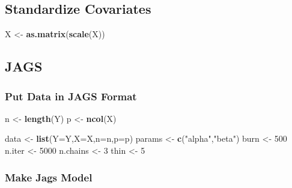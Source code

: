 \documentclass[
]{article}
\newenvironment{Shaded}{\begin{snugshade}}{\end{snugshade}}
\newcommand{\AttributeTok}[1]{\textcolor[rgb]{0.13,0.29,0.53}{#1}}
\newcommand{\DecValTok}[1]{\textcolor[rgb]{0.00,0.00,0.81}{#1}}
\newcommand{\FunctionTok}[1]{\textcolor[rgb]{0.13,0.29,0.53}{\textbf{#1}}}
\newcommand{\NormalTok}[1]{#1}
\newcommand{\OtherTok}[1]{\textcolor[rgb]{0.56,0.35,0.01}{#1}}
\newcommand{\StringTok}[1]{\textcolor[rgb]{0.31,0.60,0.02}{#1}}
\begin{document}
\subsection{Standardize Covariates}\label{standardize-covariates-3}

\begin{Shaded}
\begin{Highlighting}[]
\NormalTok{X }\OtherTok{\textless{}{-}} \FunctionTok{as.matrix}\NormalTok{(}\FunctionTok{scale}\NormalTok{(X))}
\end{Highlighting}
\end{Shaded}

\subsection{JAGS}\label{jags-3}

\subsubsection{Put Data in JAGS Format}\label{put-data-in-jags-format-3}

\begin{Shaded}
\begin{Highlighting}[]
\NormalTok{n }\OtherTok{\textless{}{-}} \FunctionTok{length}\NormalTok{(Y)}
\NormalTok{p }\OtherTok{\textless{}{-}} \FunctionTok{ncol}\NormalTok{(X)}

\NormalTok{data }\OtherTok{\textless{}{-}} \FunctionTok{list}\NormalTok{(}\AttributeTok{Y=}\NormalTok{Y,}\AttributeTok{X=}\NormalTok{X,}\AttributeTok{n=}\NormalTok{n,}\AttributeTok{p=}\NormalTok{p)}
\NormalTok{params }\OtherTok{\textless{}{-}} \FunctionTok{c}\NormalTok{(}\StringTok{"alpha"}\NormalTok{,}\StringTok{"beta"}\NormalTok{)}
\NormalTok{burn }\OtherTok{\textless{}{-}} \DecValTok{500}
\NormalTok{n.iter }\OtherTok{\textless{}{-}} \DecValTok{5000}
\NormalTok{n.chains }\OtherTok{\textless{}{-}} \DecValTok{3}
\NormalTok{thin }\OtherTok{\textless{}{-}} \DecValTok{5}
\end{Highlighting}
\end{Shaded}

\subsubsection{Make Jags Model}\label{make-jags-model-3}
\end{document}
